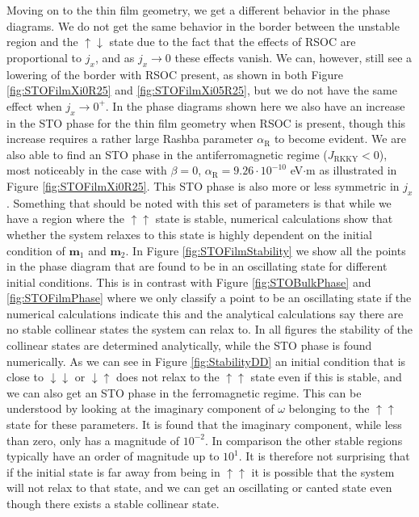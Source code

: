 Moving on to the thin film geometry, we get a different behavior in the phase diagrams. We do not get the same behavior in the border between the unstable region and the $\uparrow\downarrow$ state due to the fact that the effects of RSOC are proportional to $j_x$, and as $j_x\rightarrow 0$ these effects vanish. We can, however, still see a lowering of the border with RSOC present, as shown in both Figure \ref{fig:STOFilmXi0R25} and \ref{fig:STOFilmXi05R25}, but we do not have the same effect when $j_x\rightarrow 0^+$. In the phase diagrams shown here we also have an increase in the STO phase for the thin film geometry when RSOC is present, though this increase requires a rather large Rashba parameter $\alpha_{\text{R}}$ to become evident. We are also able to find an STO phase in the antiferromagnetic regime ($J_{\text{RKKY}}<0$), most noticeably in the case with $\beta = 0$, $\alpha_\text{R} = 9.26\cdot10^{-10}$ eV$\cdot$m as illustrated in Figure \ref{fig:STOFilmXi0R25}. This STO phase is also more or less symmetric in $j_x$. Something that should be noted with this set of parameters is that while we have a region where the $\uparrow\uparrow$ state is stable, numerical calculations show that whether the system relaxes to this state is highly dependent on the initial condition of $\mathbold{m}_1$ and $\mathbold{m}_2$. In Figure \ref{fig:STOFilmStability} we show all the points in the phase diagram that are found to be in an oscillating state for different initial conditions. This is in contrast with Figure \ref{fig:STOBulkPhase} and \ref{fig:STOFilmPhase} where we only classify a point to be an oscillating state if the numerical calculations indicate this and the analytical calculations say there are no stable collinear states the system can relax to. In all figures the stability of the collinear states are determined analytically, while the STO phase is found numerically. As we can see in Figure \ref{fig:StabilityDD} an initial condition that is close to $\downarrow\downarrow$ or $\downarrow\uparrow$ does not relax to the $\uparrow\uparrow$ state even if this is stable, and we can also get an STO phase in the ferromagnetic regime. This can be understood by looking at the imaginary component of $\omega$ belonging to the $\uparrow\uparrow$ state for these parameters. It is found that the imaginary component, while less than zero, only has a magnitude of $10^{-2}$. In comparison the other stable regions typically have an order of magnitude up to $10^1$. It is therefore not surprising that if the initial state is far away from being in $\uparrow\uparrow$ it is possible that the system will not relax to that state, and we can get an oscillating or canted state even though there exists a stable collinear state.

